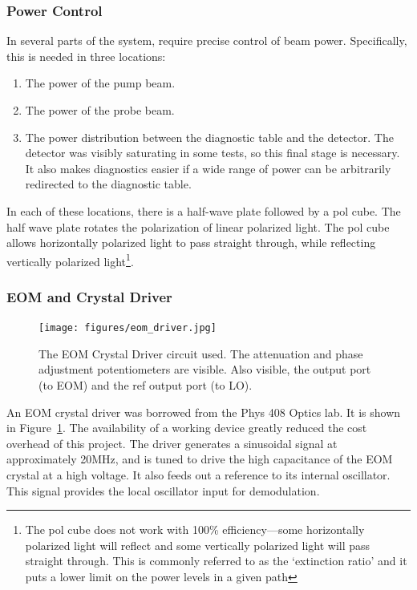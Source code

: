     \subsubsection{Power Control}

In several parts of the system, require precise control of beam power.  Specifically, this is needed in three locations: \\

\begin{enumerate}
    \item The power of the pump beam.
    \item The power of the probe beam.
    \item The power distribution between the diagnostic table and the detector.  The detector was visibly saturating in some tests, so this final stage is necessary.  It also makes diagnostics easier if a wide range of power can be arbitrarily redirected to the diagnostic table.
\end{enumerate}

In each of these locations, there is a half-wave plate followed by a pol cube.  The half wave plate rotates the polarization of linear polarized light.  The pol cube allows horizontally polarized light to pass straight through, while reflecting vertically polarized light\footnote{The pol cube does not work with 100\% efficiency—some horizontally polarized light will reflect and some vertically polarized light will pass straight through. This is commonly referred to as the `extinction ratio' and it puts a lower limit on the power levels in a given path}. \\

    \subsubsection{EOM and Crystal Driver}

\begin{figure}
  \texttt{[image: figures/eom\_driver.jpg]}
  \centering\caption{The EOM Crystal Driver circuit used.  The attenuation and phase adjustment potentiometers are visible.  Also visible, the output port (to EOM) and the ref output port (to LO).}
  \label{eom_driver}
\end{figure}

An EOM crystal driver was borrowed from the Phys 408 Optics lab.  It is shown in Figure~\ref{eom_driver}.  The availability of a working device greatly reduced the cost overhead of this project.  The driver generates a sinusoidal signal at approximately 20MHz, and is tuned to drive the high capacitance of the EOM crystal at a high voltage.  It also feeds out a reference to its internal oscillator.  This signal provides the local oscillator input for demodulation. \\

